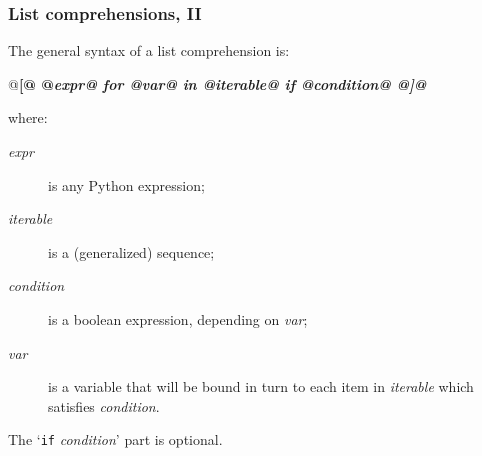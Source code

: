\documentclass[english,serif,mathserif,xcolor=pdftex,dvipsnames,table]{beamer}
\begin{document}
\begin{frame}[fragile]
  \frametitle{List comprehensions, II}
  \def\e{\ttfamily\itshape}
  
  The general syntax of a list comprehension is:
  \begin{python}
    @\bf[@ @\e expr@ for @\e var@ in @\e iterable@ if @\e condition@ @\bf]@
  \end{python}
  where:
  \begin{description}
  \item[\e expr] is any Python expression;
  \item[\e iterable] is a (generalized) sequence;
  \item[\e condition] is a boolean expression, depending on
    {\e var};
  \item[\e var] is a variable that will be bound in turn to each item
    in {\e iterable} which satisfies {\e condition}.
  \end{description}

  \+
  The `{\lstinline|if| \e condition}' part is optional.
\end{frame}







\end{document}
